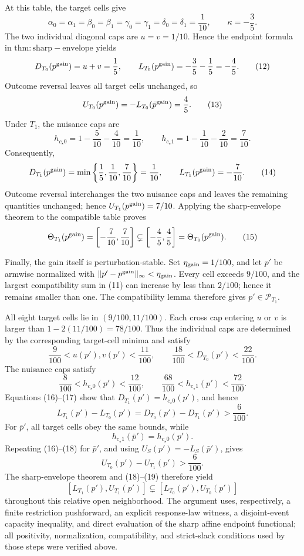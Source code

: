 At this table, the target cells give
\[
 \alpha_0=\alpha_1=\beta_0=\beta_1
 =\gamma_0=\gamma_1=\delta_0=\delta_1=\frac1{10},
 \qquad \kappa=-\frac35.
\]
The two individual diagonal caps are \(u=v=1/10\).  Hence the endpoint formula in \(\mathrm{thm{:}sharp-envelope}\) yields
\[
 D_{T_0}(p^{\rm gain})=u+v=\frac15,
 \qquad
 L_{T_0}(p^{\rm gain})=-\frac35-\frac15=-\frac45.
 \tag{12}
\]
Outcome reversal leaves all target cells unchanged, so
\[
 U_{T_0}(p^{\rm gain})=-L_{T_0}(\bar p^{\rm gain})=\frac45.
 \tag{13}
\]
Under \(T_1\), the nuisance caps are
\[
 h_{c_\star0}=1-\frac5{10}-\frac4{10}=\frac1{10},
 \qquad
 h_{c_\star1}=1-\frac1{10}-\frac2{10}=\frac7{10}.
\]
Consequently,
\[
 D_{T_1}(p^{\rm gain})
 =\min\left\{\frac15,\frac1{10},\frac7{10}\right\}=\frac1{10},
 \qquad
 L_{T_1}(p^{\rm gain})=-\frac7{10}.
 \tag{14}
\]
Outcome reversal interchanges the two nuisance caps and leaves the remaining quantities unchanged; hence \(U_{T_1}(p^{\rm gain})=7/10\).  Applying the sharp-envelope theorem to the compatible table proves
\[
 \Theta_{T_1}(p^{\rm gain})
 =\left[-\frac7{10},\frac7{10}\right]
 \subsetneq
 \left[-\frac45,\frac45\right]
 =\Theta_{T_0}(p^{\rm gain}).
 \tag{15}
\]

Finally, the gain itself is perturbation-stable.  Set \(\eta_{\rm gain}=1/100\), and let \(p'\) be armwise normalized with
\(\lVert p'-p^{\rm gain}\rVert_\infty<\eta_{\rm gain}\).  Every cell exceeds \(9/100\), and the largest compatibility sum in (11) can increase by less than \(2/100\); hence it remains smaller than one.  The compatibility lemma therefore gives \(p'\in\mathcal P_{T_1}\).

All eight target cells lie in \((9/100,11/100)\).  Each cross cap entering \(u\) or \(v\) is larger than \(1-2(11/100)=78/100\).  Thus the individual caps are determined by the corresponding target-cell minima and satisfy
\[
 \frac9{100}<u(p'),v(p')<\frac{11}{100},
 \qquad
 \frac{18}{100}<D_{T_0}(p')<\frac{22}{100}.
 \tag{16}
\]
The nuisance caps satisfy
\[
 \frac8{100}<h_{c_\star0}(p')<\frac{12}{100},
 \qquad
 \frac{68}{100}<h_{c_\star1}(p')<\frac{72}{100}.
 \tag{17}
\]
Equations (16)--(17) show that \(D_{T_1}(p')=h_{c_\star0}(p')\), and hence
\[
 L_{T_1}(p')-L_{T_0}(p')
 =D_{T_0}(p')-D_{T_1}(p')>\frac6{100}.
 \tag{18}
\]
For \(\bar p'\), all target cells obey the same bounds, while
\[
 h_{c_\star1}(\bar p')=h_{c_\star0}(p').
\]
Repeating (16)--(18) for \(\bar p'\), and using \(U_S(p')=-L_S(\bar p')\), gives
\[
 U_{T_0}(p')-U_{T_1}(p')>\frac6{100}.
 \tag{19}
\]
The sharp-envelope theorem and (18)--(19) therefore yield
\[
 [L_{T_1}(p'),U_{T_1}(p')]
 \subsetneq [L_{T_0}(p'),U_{T_0}(p')]
\]
throughout this relative open neighborhood.  The argument uses, respectively, a finite restriction pushforward, an explicit response-law witness, a disjoint-event capacity inequality, and direct evaluation of the sharp affine endpoint functional; all positivity, normalization, compatibility, and strict-slack conditions used by those steps were verified above.

